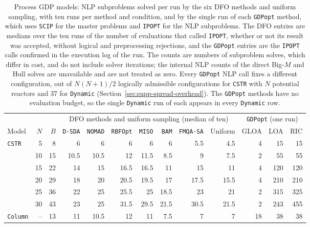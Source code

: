 \begin{table}[htbp]
\centering
\caption{Process GDP models: NLP subproblems solved per run by the six DFO methods and uniform sampling, with ten runs per method and condition, and by the single run of each \texttt{GDPopt} method, which uses \texttt{SCIP} for the master problems and \texttt{IPOPT} for the NLP subproblems.
The DFO entries are medians over the ten runs of the number of evaluations that called \texttt{IPOPT}, whether or not its result was accepted, without logical and preprocessing rejections, and the \texttt{GDPopt} entries are the \texttt{IPOPT} calls confirmed in the execution log of the run.
The counts are numbers of subproblem solves, which differ in cost, and do not include solver iterations; the internal NLP counts of the direct Big-\(M\) and Hull solves are unavailable and are not treated as zero.
Every \texttt{GDPopt} NLP call fixes a different configuration, out of \(N(N+1)/2\) logically admissible configurations for \texttt{CSTR} with \(N\) potential reactors and 37 for \texttt{Dynamic} (Section~\ref{sec:supp-spread-overhead}).
The \texttt{GDPopt} methods have no evaluation budget, so the single \texttt{Dynamic} run of each appears in every \texttt{Dynamic} row.}
\label{tab:joint-nlp-workload}
\footnotesize
\setlength{\tabcolsep}{3.5pt}
\begin{threeparttable}
\begin{tabular}{@{}lrrrrrrrrrrrr@{}}\toprule
 & & & \multicolumn{7}{c}{DFO methods and uniform sampling (median of ten)} & \multicolumn{3}{c}{\texttt{GDPopt} (one run)}\\\cmidrule(lr){4-10}\cmidrule(l){11-13}
Model & \(N\) & \(B\) & \texttt{D-SDA} & \texttt{NOMAD} & \texttt{RBFOpt} & \texttt{MISO} & \texttt{BAM} & \texttt{FMQA-SA} & Uniform & GLOA & LOA & RIC\\\midrule
\multirow{6}{*}{\texttt{CSTR}} & 5 & 8 & 6 & 6 & 6 & 6 & 6 & 5.5 & 4.5 & 4 & 15 & 15 \\
 & 10 & 15 & 10.5 & 10.5 & 12 & 11.5 & 8.5 & 9 & 7.5 & 2 & 55 & 55 \\
 & 15 & 22 & 14 & 15 & 16.5 & 16.5 & 11 & 15 & 11 & 4 & 120 & 120 \\
 & 20 & 29 & 18 & 20 & 20.5 & 19.5 & 17 & 17.5 & 15.5 & 4 & 210 & 210 \\
 & 25 & 36 & 22 & 25 & 25.5 & 25 & 18.5 & 23 & 21 & 2 & 315 & 325 \\
 & 30 & 43 & 23 & 25 & 31.5 & 29.5 & 21.5 & 30.5 & 21.5 & 2 & 243 & 455 \\
\midrule
\texttt{Column} & -- & 13 & 11 & 10.5 & 12 & 11 & 7.5 & 7 & 7 & 18 & 38 & 38 \\

\end{tabular}
\end{threeparttable}
\end{table}
